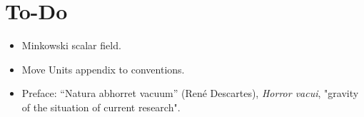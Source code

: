 \section{To-Do}
\begin{itemize}
	\item Minkowski scalar field.
	\item Move Units appendix to conventions.
	\item Preface:	“Natura abhorret vacuum” (René Descartes), \textit{Horror vacui}, "gravity of the situation of current research".
\end{itemize}